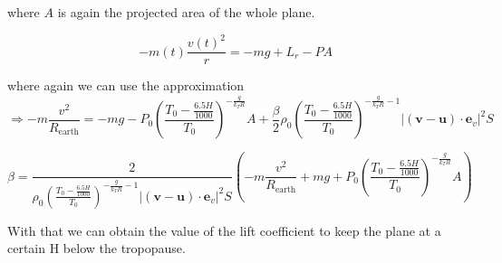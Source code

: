 \documentclass{article}
\renewcommand{\vec}[1]{\boldsymbol{#1}}
\begin{document}
where $A$ is again the projected area of the whole plane.

\begin{equation}
    -m(t)\frac{v(t)^2}{r}=-mg+ L_r -PA
\end{equation}

where again we can use the approximation
\begin{equation}
  \Rightarrow  -m\frac{v^2}{R_{\text{earth}}}= -mg- P_0\left(\frac{T_0-\frac{6.5H}{1000}}{T_0}\right)^{-\frac{g}{k_TR}}A +\frac{\beta }{2}\rho_0 \left(\frac{T_0-\frac{6.5H}{1000}}{T_0}\right)^{-\frac{g}{k_TR}-1} |(\vec{v}-\vec{u})\cdot \vec e_v|^2S
\end{equation}

\begin{equation}
\beta= \frac{2}{\rho_0 \left(\frac{T_0-\frac{6.5H}{1000}}{T_0}\right)^{-\frac{g}{k_TR}-1} |(\vec{v}-\vec{u})\cdot \vec e_v|^2S} \left(-m\frac{v^2}{R_{\text{earth}}} + mg+ P_0\left(\frac{T_0-\frac{6.5H}{1000}}{T_0}\right)^{-\frac{g}{k_TR}}A \right)
\end{equation}

With that we can obtain the value of the lift coefficient to keep the plane at a certain H below the tropopause.
\printbibliography
\end{document}
